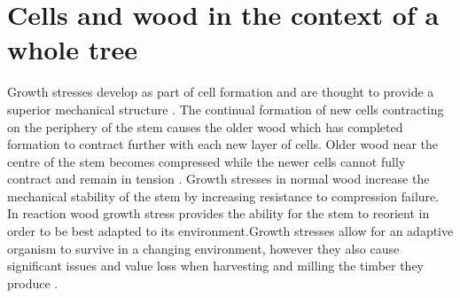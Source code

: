 \section{Cells and wood in the context of a whole tree}
Growth stresses develop as part of cell formation and are thought to provide a
superior mechanical structure \cite{mattheck1997wood}. The continual formation of new cells contracting
on the periphery of the stem causes the older wood which has completed formation
to contract further with each new layer of cells. Older wood near the centre
of the stem becomes compressed while the newer cells cannot fully contract and
remain in tension \cite{Archer_1987}.
Growth stresses in normal wood increase the mechanical stability of the stem by increasing resistance to compression failure. In reaction wood growth stress provides the ability for the stem to reorient in
order to be best adapted to its environment.Growth stresses allow for an adaptive organism to survive in a changing environment,
however they also cause significant issues and value loss when harvesting and
milling the timber they produce \cite{kubler_1987}.

